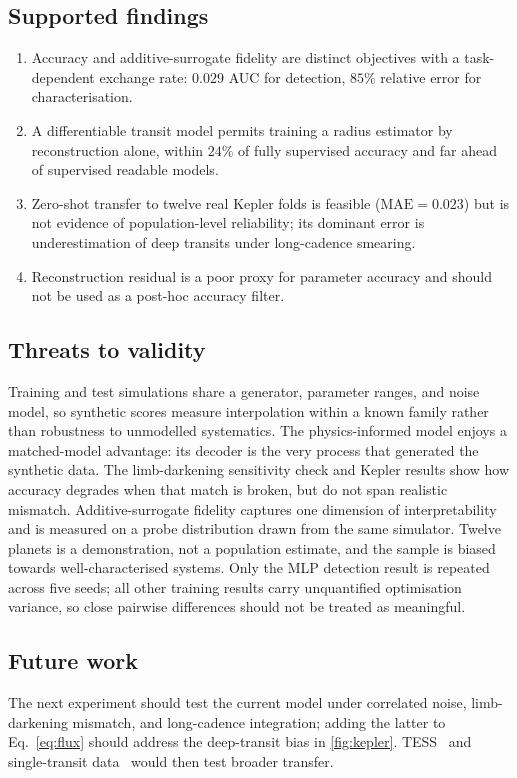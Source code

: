 \documentclass[manuscript,nonacm]{acmart}
\begin{document}
\subsection{Supported findings}
\begin{enumerate}
\item Accuracy and additive-surrogate fidelity are distinct objectives with a
      task-dependent exchange rate: $0.029$ AUC for detection, $85\%$ relative error for
      characterisation.
\item A differentiable transit model permits training a radius estimator by
      reconstruction alone, within $24\%$ of fully supervised accuracy and far ahead of
      supervised readable models.
\item Zero-shot transfer to twelve real Kepler folds is feasible
      ($\mathrm{MAE}=0.023$) but is not evidence of population-level reliability; its
      dominant error is underestimation of deep transits under long-cadence smearing.
\item Reconstruction residual is a poor proxy for parameter accuracy and should not be
      used as a post-hoc accuracy filter.
\end{enumerate}

\subsection{Threats to validity}
Training and test simulations share a generator, parameter ranges, and noise model, so
synthetic scores measure interpolation within a known family rather than robustness to
unmodelled systematics. The physics-informed model enjoys a matched-model advantage: its
decoder is the very process that generated the synthetic data. The limb-darkening
sensitivity check and Kepler results show how accuracy degrades when that match is
broken, but do not span realistic mismatch. Additive-surrogate
fidelity captures one dimension of interpretability and is measured on a probe
distribution drawn from the same simulator. Twelve planets is a demonstration, not a
population estimate, and the sample is biased towards well-characterised systems.
Only the MLP detection result is repeated across five seeds; all other training results
carry unquantified optimisation variance, so close pairwise differences should not be
treated as meaningful.

\subsection{Future work}
The next experiment should test the current model under correlated noise, limb-darkening
mismatch, and long-cadence integration; adding the latter to Eq.~\eqref{eq:flux} should
address the deep-transit bias in \cref{fig:kepler}. TESS~\cite{ricker2015tess} and
single-transit data~\cite{foremanmackey2016} would then test broader transfer.
\end{document}

